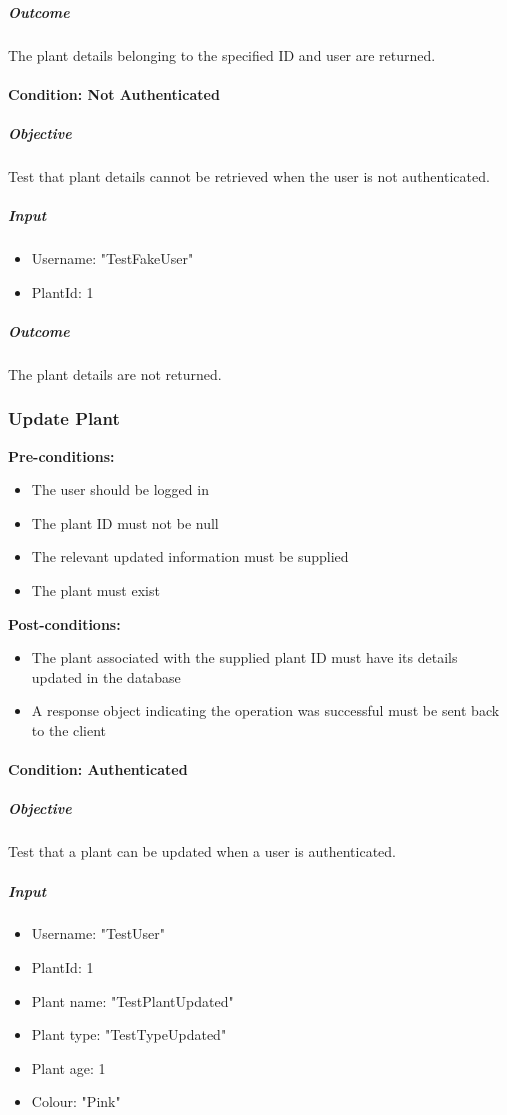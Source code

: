 \documentclass{article}
\begin{document}
		\subparagraph{Outcome}
		The plant details belonging to the specified ID and user are returned.
		
		\paragraph{Condition: Not Authenticated}
		\subparagraph{Objective}
		Test that plant details cannot be retrieved when the user is not authenticated.
		\subparagraph{Input}
		\begin{itemize}
			\item Username: "TestFakeUser"
			\item PlantId: 1
		\end{itemize}
		
		\subparagraph{Outcome}
		The plant details are not returned.
	
		\subsubsection{Update Plant}
		\textbf{Pre-conditions:}
		\begin{itemize}
			\item The user should be logged in
			\item The plant ID must not be null
			\item The relevant updated information must be supplied
			\item The plant must exist
		\end{itemize}
		\textbf{Post-conditions:}
		\begin{itemize}
			\item The plant associated with the supplied plant ID must have its details updated in the database
			\item A response object indicating the operation was successful must be sent back to the client
		\end{itemize}
		
		\paragraph{Condition: Authenticated}
		\subparagraph{Objective}
		Test that a plant can be updated when a user is authenticated.
		\subparagraph{Input}
		\begin{itemize}
			\item Username: "TestUser"
			\item PlantId: 1
			\item Plant name: "TestPlantUpdated"
			\item Plant type: "TestTypeUpdated"
			\item Plant age: 1
			\item Colour: "Pink"
		\end{itemize}
		
\end{document}
